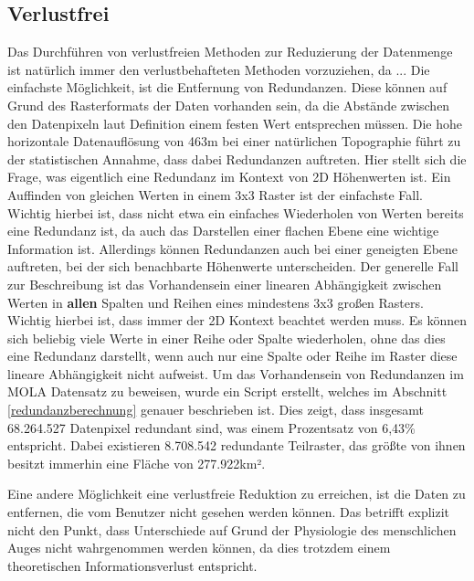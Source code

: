 \subsection{Verlustfrei}
Das Durchführen von verlustfreien Methoden zur Reduzierung der Datenmenge ist natürlich immer den verlustbehafteten Methoden vorzuziehen, da ...
Die einfachste Möglichkeit, ist die Entfernung von Redundanzen. Diese können auf Grund des Rasterformats der Daten vorhanden sein, da die Abstände zwischen den Datenpixeln laut Definition einem festen Wert entsprechen müssen. Die hohe horizontale Datenauflösung von 463m bei einer natürlichen Topographie führt zu der statistischen Annahme, dass dabei Redundanzen auftreten. Hier stellt sich die Frage, was eigentlich eine Redundanz im Kontext von 2D Höhenwerten ist. Ein Auffinden von gleichen Werten in einem 3x3 Raster ist der einfachste Fall. Wichtig hierbei ist, dass nicht etwa ein einfaches Wiederholen von Werten bereits eine Redundanz ist, da auch das Darstellen einer flachen Ebene eine wichtige Information ist. Allerdings können Redundanzen auch bei einer geneigten Ebene auftreten, bei der sich benachbarte Höhenwerte unterscheiden. Der generelle Fall zur Beschreibung ist das Vorhandensein einer linearen Abhängigkeit zwischen Werten in \textbf{allen} Spalten und Reihen eines mindestens 3x3 großen Rasters\cite{topoDataReduction}. Wichtig hierbei ist, dass immer der 2D Kontext beachtet werden muss. Es können sich beliebig viele Werte in einer Reihe oder Spalte wiederholen, ohne das dies eine Redundanz darstellt, wenn auch nur eine Spalte oder Reihe im Raster diese lineare Abhängigkeit nicht aufweist. Um das Vorhandensein von Redundanzen im MOLA Datensatz zu beweisen, wurde ein Script erstellt, welches im Abschnitt \ref{redundanzberechnung} genauer beschrieben ist. Dies zeigt, dass insgesamt 68.264.527 Datenpixel redundant sind, was einem Prozentsatz von 6,43\% entspricht. Dabei existieren 8.708.542 redundante Teilraster, das größte von ihnen besitzt immerhin eine Fläche von 277.922km².

Eine andere Möglichkeit eine verlustfreie Reduktion zu erreichen, ist die Daten zu entfernen, die vom Benutzer nicht gesehen werden können. Das betrifft explizit nicht den Punkt, dass Unterschiede auf Grund der Physiologie des menschlichen Auges nicht wahrgenommen werden können, da dies trotzdem einem theoretischen Informationsverlust entspricht.


